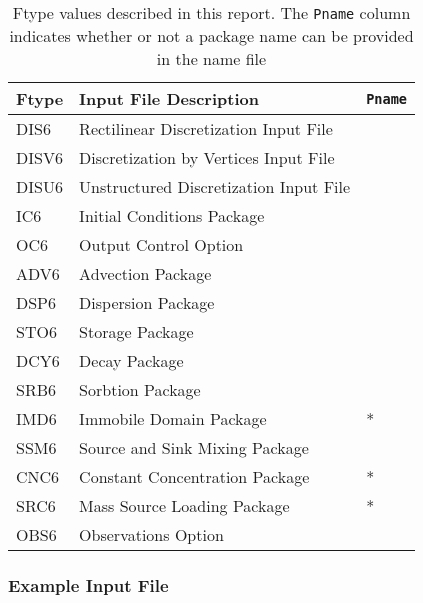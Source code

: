 \begin{table}[H]
\caption{Ftype values described in this report.  The \texttt{Pname} column indicates whether or not a package name can be provided in the name file}
\small
\begin{center}
\begin{tabular*}{\columnwidth}{l l l}
\hline
\hline
Ftype & Input File Description & \texttt{Pname}\\
\hline
DIS6 & Rectilinear Discretization Input File \\
DISV6 & Discretization by Vertices Input File \\
DISU6 & Unstructured Discretization Input File \\
IC6 & Initial Conditions Package \\
OC6 & Output Control Option \\
ADV6 & Advection Package \\ 
DSP6 & Dispersion Package \\ 
STO6 & Storage Package \\
DCY6 & Decay Package \\
SRB6 & Sorbtion Package \\
IMD6 & Immobile Domain Package & * \\
SSM6 & Source and Sink Mixing Package \\ 
CNC6 & Constant Concentration Package & *\\ 
SRC6 & Mass Source Loading Package & * \\ 
OBS6 & Observations Option \\
\hline 
\end{tabular*}
\label{table:ftype}
\end{center}
\normalsize
\end{table}

\vspace{5mm}
\subsubsection{Example Input File}


